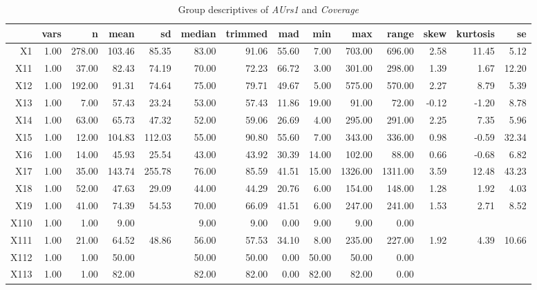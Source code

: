 \begin{table}[ht]
	\small
	\centering
	\begin{tabular}{rrrrrrrrrrrrrr}
		\hline
	   & vars & n & mean & sd & median & trimmed & mad & min & max & range & skew & kurtosis & se \\ 
		\hline
	  X1 & 1.00 & 278.00 & 103.46 & 85.35 & 83.00 & 91.06 & 55.60 & 7.00 & 703.00 & 696.00 & 2.58 & 11.45 & 5.12 \\ 
		X11 & 1.00 & 37.00 & 82.43 & 74.19 & 70.00 & 72.23 & 66.72 & 3.00 & 301.00 & 298.00 & 1.39 & 1.67 & 12.20 \\ 
		X12 & 1.00 & 192.00 & 91.31 & 74.64 & 75.00 & 79.71 & 49.67 & 5.00 & 575.00 & 570.00 & 2.27 & 8.79 & 5.39 \\ 
		X13 & 1.00 & 7.00 & 57.43 & 23.24 & 53.00 & 57.43 & 11.86 & 19.00 & 91.00 & 72.00 & -0.12 & -1.20 & 8.78 \\ 
		X14 & 1.00 & 63.00 & 65.73 & 47.32 & 52.00 & 59.06 & 26.69 & 4.00 & 295.00 & 291.00 & 2.25 & 7.35 & 5.96 \\ 
		X15 & 1.00 & 12.00 & 104.83 & 112.03 & 55.00 & 90.80 & 55.60 & 7.00 & 343.00 & 336.00 & 0.98 & -0.59 & 32.34 \\ 
		X16 & 1.00 & 14.00 & 45.93 & 25.54 & 43.00 & 43.92 & 30.39 & 14.00 & 102.00 & 88.00 & 0.66 & -0.68 & 6.82 \\ 
		X17 & 1.00 & 35.00 & 143.74 & 255.78 & 76.00 & 85.59 & 41.51 & 15.00 & 1326.00 & 1311.00 & 3.59 & 12.48 & 43.23 \\ 
		X18 & 1.00 & 52.00 & 47.63 & 29.09 & 44.00 & 44.29 & 20.76 & 6.00 & 154.00 & 148.00 & 1.28 & 1.92 & 4.03 \\ 
		X19 & 1.00 & 41.00 & 74.39 & 54.53 & 70.00 & 66.09 & 41.51 & 6.00 & 247.00 & 241.00 & 1.53 & 2.71 & 8.52 \\ 
		X110 & 1.00 & 1.00 & 9.00 &  & 9.00 & 9.00 & 0.00 & 9.00 & 9.00 & 0.00 &  &  &  \\ 
		X111 & 1.00 & 21.00 & 64.52 & 48.86 & 56.00 & 57.53 & 34.10 & 8.00 & 235.00 & 227.00 & 1.92 & 4.39 & 10.66 \\ 
		X112 & 1.00 & 1.00 & 50.00 &  & 50.00 & 50.00 & 0.00 & 50.00 & 50.00 & 0.00 &  &  &  \\ 
		X113 & 1.00 & 1.00 & 82.00 &  & 82.00 & 82.00 & 0.00 & 82.00 & 82.00 & 0.00 &  &  &  \\ 
		 \hline
	  \end{tabular}
    \caption{Group descriptives of \textit{AUrs1} and \textit{Coverage}}
    \label{tbl:descriptives_baysis_initiator_AUrs1_Cov}
\end{table}

